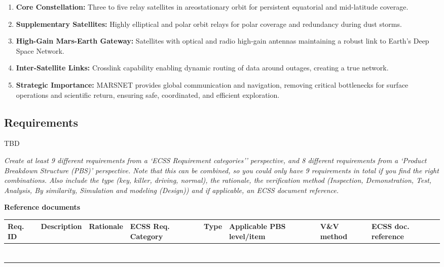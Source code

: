 \documentclass[../main.tex]{subfiles}
\begin{document}
\begin{enumerate}[left=0pt, label=\arabic*., itemsep=2pt, topsep=2pt]
    \item \textbf{Core Constellation:} Three to five relay satellites in areostationary orbit for persistent equatorial and mid-latitude coverage.
    \item \textbf{Supplementary Satellites:} Highly elliptical and polar orbit relays for polar coverage and redundancy during dust storms.
    \item \textbf{High-Gain Mars-Earth Gateway:} Satellites with optical and radio high-gain antennas maintaining a robust link to Earth's Deep Space Network.
    \item \textbf{Inter-Satellite Links:} Crosslink capability enabling dynamic routing of data around outages, creating a true network.
    \item \textbf{Strategic Importance:} MARSNET provides global communication and navigation, removing critical bottlenecks for surface operations and scientific return, ensuring safe, coordinated, and efficient exploration.
\end{enumerate}
\newpage

\subsection{Requirements}\label{requirements}

TBD


\emph{Create at least 9 different requirements from a `ECSS Requirement
categories'' perspective, and 8 different requirements from a `Product
Breakdown Structure (PBS)' perspective. Note that this can be combined,
so you could only have 9 requirements in total if you find the right
combinations. Also include the type (key, killer, driving, normal), the
rationale, the verification method (Inspection, Demonstration, Test,
Analysis, By similarity, Simulation and modeling (Design)) and if
applicable, an ECSS document reference.}

\textbf{Reference documents}
\begin{table}[htp]
\centering
\begin{tabularx}{\textwidth}{|p{0.6cm}|X|p{1.5cm}|p{2cm}|p{1cm}|p{2cm}|p{1.2cm}|p{1.4cm}|}
\hline
Req. ID & Description & Rationale & ECSS Req. Category & Type & Applicable PBS level/item & V\&V method & ECSS doc. reference \\
\hline
& & & & & & & \\
\hline
& & & & & & & \\
\hline
& & & & & & & \\
\hline
& & & & & & & \\
\hline
& & & & & & & \\
\hline
& & & & & & & \\
\hline
& & & & & & & \\
\hline
\end{tabularx}
\end{table}
\end{document}
